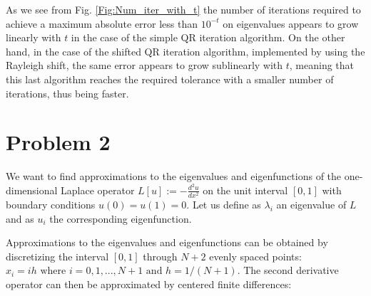 \documentclass[a4paper,11pt]{article}
\newcommand{\R}{\mathbb{R}}
\begin{document}
\noindent As we see from Fig. \ref{Fig:Num_iter_with_t}  the number of iterations required to achieve a maximum absolute error less than $10^{-t}$ on eigenvalues appears to grow linearly with $t$ in the case of the simple QR iteration algorithm. On the other hand, in the case of the shifted QR iteration algorithm, implemented by using the Rayleigh shift, the same error appears to grow sublinearly with $t$, meaning that this last algorithm reaches the required tolerance with a smaller number of iterations, thus being faster.

	
\section*{Problem 2}	
We want to find approximations to the eigenvalues and eigenfunctions of the one-dimensional Laplace operator $L[u] := - \frac{d^2 u }{dx^2}$ on the unit interval $[0,1]$ with boundary conditions $u(0) = u(1) = 0$. Let us define as $\lambda_{i}$ an eigenvalue of $L$ and as $u_{i}$  the corresponding eigenfunction.
%
%

\noindent Approximations to the eigenvalues and eigenfunctions can be obtained by discretizing the interval $[0, 1]$ through $N+2$ evenly spaced points: $x_i =ih \text{ where } i=0,1,...,N+1 \text{ and } h=1/(N+1)$. The second derivative operator can then be approximated by centered finite differences:
\end{document}
